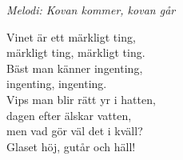{\footnotesize\textit{Melodi: Kovan kommer, kovan går}}\par
\vspace{10pt}
Vinet är ett märkligt ting,\\
märkligt ting, märkligt ting.\\
Bäst man känner ingenting,\\
ingenting, ingenting.\\
Vips man blir rätt yr i hatten,\\
dagen efter älskar vatten,\\
men vad gör väl det i kväll?\\
Glaset höj, gutår och häll!

